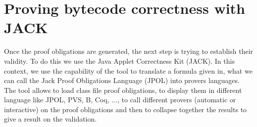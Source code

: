 \section{Proving bytecode correctness with JACK}\label{jack}

Once the proof obligations are generated, the next step is trying to establish their validity. To do this we use the Java Applet Correctness Kit (JACK). 
In this context, we use the capability of the tool to translate a formula given in, what we can call the Jack Proof Obligations Language (JPOL) into provers languages.
The tool allows to load class file proof obligations, to display them in different language like JPOL, PVS, B, Coq, ..., to call different provers (automatic or interactive) on the proof obligations and then to collapse together the results to give a result on the validation.

   
